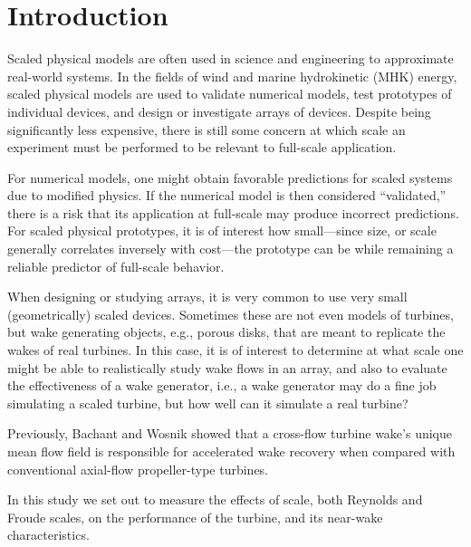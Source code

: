 \documentclass[energies,article,accept,moreauthors,pdftex,12pt,a4paper]{mdpi}
\begin{document}
\listoftodos

\section{Introduction}


Scaled physical models are often used in science and engineering to approximate
real-world systems. In the fields of wind and marine hydrokinetic (MHK) energy,
scaled physical models are used to validate numerical models, test prototypes of
individual devices, and design or investigate arrays of devices. Despite being
significantly less expensive, there is still some concern at which scale an
experiment must be performed to be relevant to full-scale application.

For numerical models, one might obtain favorable predictions for scaled systems
due to modified physics. If the numerical model is then considered
``validated,'' there is a risk that its application at full-scale may produce
incorrect predictions. For scaled physical prototypes, it is of interest how
small---since size, or scale generally correlates inversely with cost---the
prototype can be while remaining a reliable predictor of full-scale behavior.

When designing or studying arrays, it is very common to use very small
(geometrically) scaled devices. Sometimes these are not even models of turbines,
but wake generating objects, e.g., porous disks, that are meant to replicate the
wakes of real turbines. In this case, it is of interest to determine at what
scale one might be able to realistically study wake flows in an array, and also
to evaluate the effectiveness of a wake generator, i.e., a wake generator may do
a fine job simulating a scaled turbine, but how well can it simulate a real
turbine?

Previously, Bachant and Wosnik \cite{Bachant2014_JOT} showed that a cross-flow
turbine wake's unique mean flow field is responsible for accelerated wake
recovery when compared with conventional axial-flow propeller-type turbines.


In this study we set out to measure the effects of scale, both Reynolds and
Froude scales, on the performance of the turbine, and its near-wake
characteristics.
\end{document}
